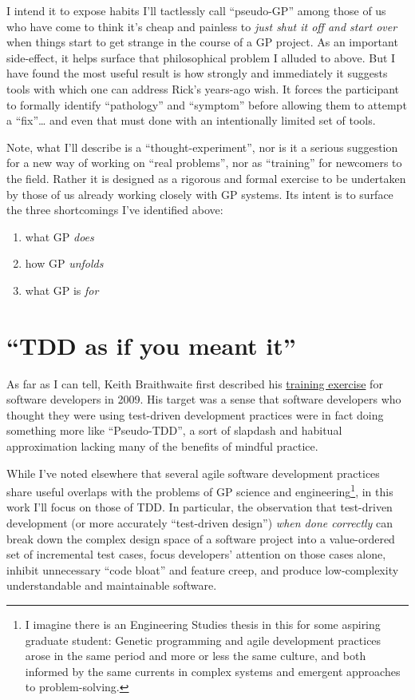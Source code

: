 I intend it to expose habits I'll tactlessly call ``pseudo-GP'' among those of us who have come to think it's cheap and painless to \emph{just shut it off and start over} when things start to get strange in the course of a GP project. As an important side-effect, it helps surface that philosophical problem I alluded to above. But I have found the most useful result is how strongly and immediately it suggests tools with which one can address Rick's years-ago wish. It forces the participant to formally identify ``pathology'' and ``symptom'' before allowing them to attempt a ``fix''\ldots{} and even that must done with an intentionally limited set of tools.

Note, what I'll describe is a ``thought-experiment'', nor is it a serious suggestion for a new way of working on ``real problems'', nor as ``training'' for newcomers to the field. Rather it is designed as a rigorous and formal exercise to be undertaken by those of us already working closely with GP systems. Its intent is to surface the three shortcomings I've identified above:

\begin{enumerate}
\item what GP \emph{does}
\item how GP \emph{unfolds}
\item what GP is \emph{for}
\end{enumerate}

\section{``TDD as if you meant it''}\hypertarget{tdd-as-if-you-meant-it}{}\label{tdd-as-if-you-meant-it}

As far as I can tell, Keith Braithwaite first described his \href{http://cumulative-hypotheses.org/2011/08/30/tdd-as-if-you-meant-it/}{training exercise} for software developers in 2009. His target was a sense that software developers who thought they were using test-driven development practices were in fact doing something more like ``Pseudo-TDD'', a sort of slapdash and habitual approximation lacking many of the benefits of mindful practice.

While I've noted elsewhere that several agile software development practices share useful overlaps with the problems of GP science and engineering\footnote{I imagine there is an Engineering Studies thesis in this for some aspiring graduate student: Genetic programming and agile development practices arose in the same period and more or less the same culture, and both informed by the same currents in complex systems and emergent approaches to problem-solving.}, in this work I'll focus on those of TDD. In particular, the observation that test-driven development (or more accurately ``test-driven design'') \emph{when done correctly} can break down the complex design space of a software project into a value-ordered set of incremental test cases, focus developers' attention on those cases alone, inhibit unnecessary ``code bloat'' and feature creep, and produce low-complexity understandable and maintainable software.


